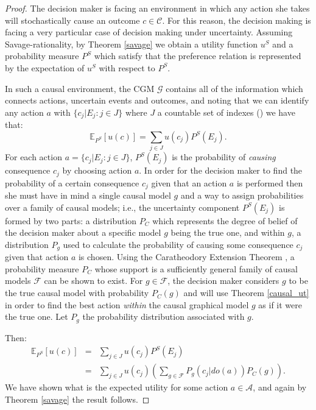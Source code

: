 \documentclass{svjour3}                     %
\begin{document}
\begin{proof}
The decision maker is facing an environment in which any action she takes will stochastically cause an outcome $c \in \mathcal{C}$. For this reason, the decision making is facing a very particular case of decision making under uncertainty. Assuming Savage-rationality, by Theorem \ref{savage} we obtain a utility function $u^S$ and a probability measure $P^S$ which satisfy that the preference relation is represented by the expectation of $u^S$ with respect to $P^S$. 

In such a causal environment, the CGM $\mathcal{G}$ contains all of the information which connects actions, uncertain events and outcomes, and noting that we can identify any action $a$ with $\{ c_j | E_j : j \in J  \}$ where $J$ a countable set of indexes (\cite{bernardo2000bayesian}) we have that:
\[\mathbb{E}_{P^S}[u(c)] = \sum_{j \in J} u(c_j)P^S(E_j).\]
For each action $a=\{ c_j | E_j : j \in J \}$, $P^S(E_j)$ is the probability of \textit{causing} consequence $c_j$ by choosing action $a$. In order for the decision maker to find the probability of a certain consequence $c_j$ given that an action $a$ is performed then she must have in mind a single causal model $g$ and a way to assign probabilities over a family of causal models; i.e., the uncertainty component $P^S(E_j)$ is formed by two parts: a distribution $P_C$ which represents the degree of belief of the decision maker about a specific model $g$ being the true one, and within $g$, a distribution $P_g$ used to calculate the probability of causing some consequence $c_j$ given that action $a$ is chosen. Using the Caratheodory Extension Theorem \citep{ash2000probability}, a probability measure  $P_C$ whose support is a sufficiently general family of causal models $\mathcal{F}$ can be shown to exist. For $g \in \mathcal{F}$, the decision maker considers $g$ to be the true causal model with probability $P_C(g)$ and will use Theorem \ref{causal_ut} in order to find the best action \textit{within} the causal graphical model $g$ as if it were the true one. Let $P_g$ the probability distribution associated with $g$. 

Then:
\begin{eqnarray*}
\mathbb{E}_{P^S}[u(c)] &=& \sum_{j \in J} u(c_j)P^S(E_j)\\
                                      &=& \sum_{j \in J} u(c_j) \left( \sum_{g \in \mathcal{F}} P_g(c_j | do(a))P_C(g) \right).
\end{eqnarray*}
We have shown what is the expected utility for some action $a \in \mathcal{A}$, and again by Theorem \ref{savage} the result follows. 
\end{proof}
\end{document}
